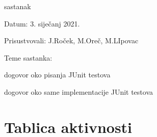 \begin{packed_enum}
			\item  sastanak
		\item[] \begin{packed_item}
			\item Datum: 3. siječanj 2021.
			\item Prisustvovali: J.Roček, M.Oreč, M.LIpovac
			\item Teme sastanka:
			\begin{packed_item}
				\item dogovor oko pisanja JUnit testova
			    \item dogovor oko same implementacije JUnit testova
			\end{packed_item}
		\end{packed_item}
		
	\end{packed_enum}

		
		
		\eject
		\section*{Tablica aktivnosti}
		
			
					
						
			
